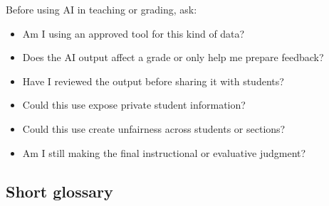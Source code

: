 \documentclass{SIAMbook2023}
\begin{document}
Before using AI in teaching or grading, ask:

\begin{itemize}[label=$\square$]
\item Am I using an approved tool for this kind of data?
\item Does the AI output affect a grade or only help me prepare feedback?
\item Have I reviewed the output before sharing it with students?
\item Could this use expose private student information?
\item Could this use create unfairness across students or sections?
\item Am I still making the final instructional or evaluative judgment?
\end{itemize}

\subsection{Short glossary}
\label{i:app:glossary}%
\end{document}
